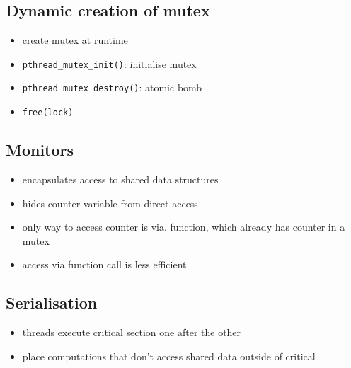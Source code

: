 \documentclass[10pt, multicolumn, a4paper]{article}
\begin{document}
\begin{multicols}{2}
	\subsection*{Dynamic creation of mutex}
	\begin{itemize}
	\item create mutex at runtime
	\item \verb|pthread_mutex_init()|: initialise mutex
	\item \verb|pthread_mutex_destroy()|: atomic bomb
	\item \verb|free(lock)|
	\end{itemize}
	\subsection*{Monitors}
	\begin{itemize}
	\item encapsulates access to shared data structures
	\item hides counter variable from direct access
	\item only way to access counter is via. function, which already has counter in a mutex
	\item access via function call is less efficient
	\end{itemize}
	\subsection*{Serialisation}
	\begin{itemize}
	\item threads execute critical section one after the other
	\item place computations that don't access shared data outside of critical
	\end{itemize}

\end{multicols}
\end{document}
